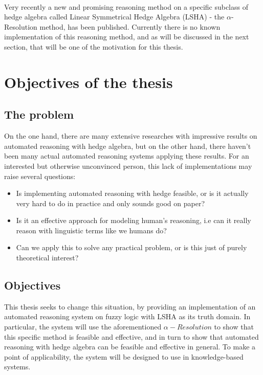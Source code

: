 \documentclass[../gr-final.tex]{subfiles}
\begin{document}
\paragraph{}
Very recently a new and promising reasoning method on a specific
subclass of hedge algebra called Linear Symmetrical Hedge Algebra
(LSHA) - the $\alpha$-Resolution method, has been published.
Currently there is no known implementation of this reasoning
method, and as will be discussed in the next section, that will
be one of the motivation for this thesis.

\section{Objectives of the thesis}
\subsection{The problem} On the one hand, there are many extensive researches with
impressive results on automated reasoning with hedge algebra, but
on the other hand, there haven't been many actual automated
reasoning systems applying these results. For an interested but
otherwise unconvinced person, this lack of implementations may raise several
questions: 
\begin{itemize}
        \item Is implementing automated reasoning with hedge
                feasible, or is it actually very hard to do in
                practice and only sounds good on paper?
        \item Is it an effective approach for modeling
                human's reasoning, i.e can it really reason with
                linguistic terms like we humans do?
        \item Can we apply this to solve any practical problem,
                or is this just of purely theoretical interest?
\end{itemize}
\subsection{Objectives} This thesis seeks to change this situation, by
providing an implementation of an automated reasoning system on
fuzzy logic with LSHA as its truth domain. In particular,
the system will use the aforementioned $\alpha-Resolution$ to show that
this specific method is feasible and effective, and in turn to
show that automated reasoning with hedge algebra can be feasible
and effective in general. To make a point of
applicability, the system will be designed to use in
knowledge-based systems.
\end{document}
